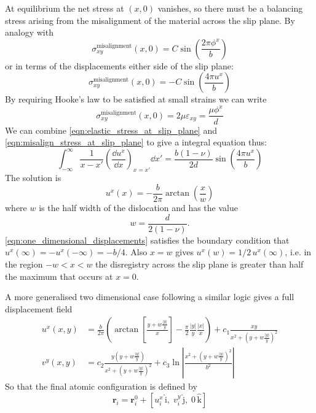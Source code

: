 At equilibrium the net stress at $(x,0)$ vanishes, so there must be a balancing stress arising from the misalignment of the material across the slip plane. By analogy with \citet{Frenkel1926}
\begin{equation}
\sigma_{xy}^{\text{misalignment}}(x,0) = C \sin \left( \frac{2\pi \phi^x}{b} \right)
\end{equation}
or in terms of the displacements either side of the slip plane:
\begin{equation}
\sigma_{xy}^{\text{misalignment}}(x,0) = -C \sin \left( \frac{4\pi u^x}{b} \right)
\end{equation}
By requiring Hooke's law to be satisfied at small strains we can write
\begin{equation}
\sigma_{xy}^{\text{misalignment}}(x,0) = 2 \mu \varepsilon_{xy} = \frac{\mu{}\phi^x}{d}
\label{eqn:misalign_stress_at_slip_plane}
\end{equation}
We can combine \autoref{eqn:elastic_stress_at_slip_plane} and \autoref{eqn:misalign_stress_at_slip_plane} to give a integral equation thus:
\begin{equation}
\int^{\infty}_{-\infty} \frac{1}{x-x'} \left(\!\frac{\dd u^x}{\dd x}\right)_{x=x'} \dd x' = \frac{b(1-\nu)}{2d} \sin\left(\frac{4\pi{}u^x}{b}\right)
\end{equation}
The solution is \cite{hirth_lothe1982peierls_displacements,Eshelby1949}
\begin{equation}
u^x(x) = -\frac{b}{2\pi} \arctan \left( \frac{x}{w} \right)
\label{eqn:one_dimensional_displacements}
\end{equation}
where $w$ is the half width of the dislocation and has the value
\begin{equation}
w = \frac{d}{2(1-\nu)}.\label{eqn:half_width}
\end{equation}
\autoref{eqn:one_dimensional_displacements} satisfies the boundary condition that $u^x(\infty) = - u^x(-\infty) = -b/4$. Also $x=w$ gives $u^x(w)=1/2\, u^x(\infty)$, i.e. in the region $-w < x < w$ the disregistry across the slip plane is greater than half the maximum that occurs at $x=0$.

A more generalised two dimensional case following a similar logic gives a full displacement field \cite{Eshelby1949,Leibfried1949,nabarro1987theory}
\begin{subequations}\label{eqn:displacements}
\begin{align}
u^x(x,y) &= \frac{b}{2\pi} \left( \arctan \left[ \frac{y +  w\frac{|y|}{y}}{x} \right] - \frac{\pi}{2} \frac{|y|}{y} \frac{|x|}{x} \right) + c_1 \frac{xy}{x^{2} + (y + w\frac{|y|}{y} )^2} \\
v^y(x,y) &= c_2 \frac{y(y +  w \frac{|y|}{y})}{x^2 + (y +  w \frac{|y|}{y})^2} + c_3 \ln \left| \frac{x^2 + (y +  w \frac{|y|}{y})^2}{b^2} \right|
\end{align}
\end{subequations}
So that the final atomic configuration is defined by 
\begin{equation}
\bm{r}_i = \bm{r}_i^0 + [u_i^x\,\bm{\mathrm{\hat{i}}},\; v_i^y\,\bm{\mathrm{\hat{j}}},\; 0\,\bm{\mathrm{\hat{k}}}]
\end{equation}



